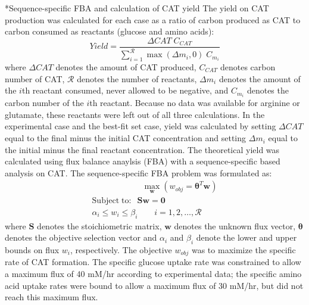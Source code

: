 \documentclass[12pt]{article}
\makeatletter
\renewcommand\subsection{\@startsection
	{subsection}{2}{0mm}
	{-0.05in}
	{-0.5\baselineskip}
	{\normalfont\normalsize\bfseries}}
\makeatother
\begin{document}
\subsection*{Sequence-specific FBA and calculation of CAT yield}
The yield on CAT production was calculated for each case as a ratio of carbon produced as CAT to carbon consumed as reactants (glucose and amino acids):
\begin{equation}\label{eqn:yield-definition}
	Yield=\frac{\Delta CAT\;C_{CAT}}{\sum_{i=1}^{\mathcal{R}}\max(\Delta m_{i},0)\;C_{m_i}}
\end{equation}
where $\Delta CAT$ denotes the amount of CAT produced, $C_{CAT}$ denotes carbon number of CAT, $\mathcal{R}$ denotes the number of reactants, $\Delta m_{i}$ denotes the amount of the $i$th reactant consumed, never allowed to be negative, and $C_{m_i}$ denotes the carbon number of the $i$th reactant.
Because no data was available for arginine or glutamate, these reactants were left out of all three calculations.
In the experimental case and the best-fit set case, yield was calculated by setting $\Delta CAT$ equal to the final minus the initial CAT concentration and setting $\Delta m_{i}$ equal to the initial minus the final reactant concentration.
The theoretical yield was calculated using flux balance anaylsis (FBA) with a sequence-specific based analysis on CAT.
The sequence-specific FBA \cite{2002_allen_palsson} problem was formulated as:
\begin{equation}\nonumber
 \begin{multlined}
	\qquad \qquad \qquad \max_{\boldsymbol{w}}{} \! \left( w_{obj} = \mathbf{\boldsymbol{\theta}}^T \boldsymbol{w} \right) \\
	\mathrm{Subject \; to:}
	 \; \; \mathbf{S}\mathbf{w}=\mathbf{0} \\
\alpha_i \leq w_i \leq \beta_i  \qquad i=1,2,\hdots,\mathcal{R}
 \end{multlined}
\end{equation}
where $\mathbf{S}$ denotes the stoichiometric matrix, $\mathbf{w}$ denotes the unknown flux vector, $\boldsymbol{\theta}$ denotes the objective selection vector
and $\alpha_i$ and $\beta_i$ denote the lower and upper bounds on flux $w_{i}$, respectively.
The objective $w_{obj}$ was to maximize the specific rate of CAT formation.
The specific glucose uptake rate was constrained to allow a maximum flux of 40 mM/hr according to experimental data; the specific amino acid uptake rates were bound to allow a maximum flux of 30 mM/hr, but did not reach this maximum flux.
\end{document}
